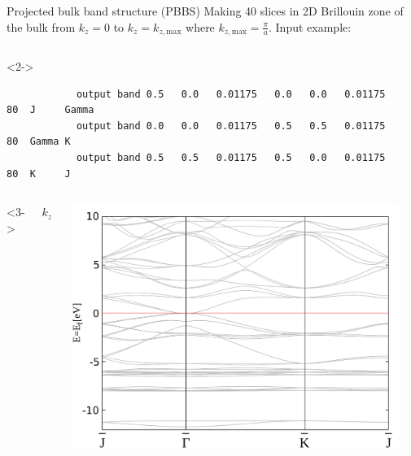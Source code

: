 \begin{frame}[fragile]{Projected bulk band structure (PBBS)}
	Making 40 slices in 2D Brillouin zone of the bulk from $k_z=0$ to $k_z=k_{z,\text{max}}$ where $k_{z,\text{max}}=\frac{\pi}{a}$. Input example:
	\vspace{-.3cm}
	\begin{columns} 
		\begin{column}<2->{\linewidth}\scriptsize{
			\begin{verbatim}
			output band 0.5   0.0   0.01175   0.0   0.0   0.01175    80  J     Gamma
			output band 0.0   0.0   0.01175   0.5   0.5   0.01175    80  Gamma K
			output band 0.5   0.5   0.01175   0.5   0.0   0.01175    80  K     J
			\end{verbatim} }
		\end{column}
	\end{columns}
	\begin{columns}<3->
		\begin{column}{.165\linewidth} \scriptsize{
				$k_z=0$}
		\end{column} \hspace{-.5cm}
		\begin{column}{.33\linewidth}
			\centering
			\includegraphics[width=\linewidth]{andere_bilder/0_bulk_-12_10.pdf}
		\end{column}
		\begin{column}{.33\linewidth}

\end{column}
\end{columns}
\end{frame}
